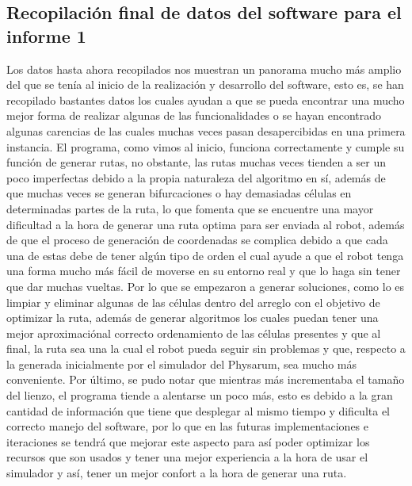 \subsection{Recopilaci\'on final de datos del software para el informe 1}
    Los datos hasta ahora recopilados nos muestran un panorama
        mucho m\'as amplio del que se ten\'ia al inicio de la realizaci\'on
        y desarrollo del software, esto es, se han recopilado
        bastantes datos los cuales ayudan a que se pueda encontrar
        una mucho mejor forma de realizar algunas de las
        funcionalidades o se hayan encontrado algunas carencias de
        las cuales muchas veces pasan desapercibidas en una
        primera instancia.
        \vskip 0.5cm
    El programa, como vimos al inicio, funciona correctamente
        y cumple su funci\'on de generar rutas, no obstante, las rutas
        muchas veces tienden a ser un poco imperfectas debido a la
        propia naturaleza del algoritmo en s\'i, adem\'as de que muchas
        veces se generan bifurcaciones o hay demasiadas c\'elulas en
        determinadas partes de la ruta, lo que fomenta que se
        encuentre una mayor dificultad a la hora de generar una ruta
        optima para ser enviada al robot, adem\'as de que el proceso
        de generaci\'on de coordenadas se complica debido a que cada
        una de estas debe de tener alg\'un tipo de orden el cual ayude
        a que el robot tenga una forma mucho m\'as f\'acil de moverse
        en su entorno real y que lo haga sin tener que dar muchas
        vueltas.
        \vskip 0.5cm
    Por lo que se empezaron a generar soluciones, como lo es
        limpiar y eliminar algunas de las c\'elulas dentro del arreglo
        con el objetivo de optimizar la ruta, adem\'as de generar
        algoritmos los cuales puedan tener una mejor aproximaci\'onal correcto ordenamiento de las c\'elulas presentes y que al
        final, la ruta sea una la cual el robot pueda seguir sin
        problemas y que, respecto a la generada inicialmente por el
        simulador del Physarum, sea mucho m\'as conveniente.
        Por \'ultimo, se pudo notar que mientras m\'as incrementaba el
        tama\~no del lienzo, el programa tiende a alentarse un poco
        m\'as, esto es debido a la gran cantidad de informaci\'on que
        tiene que desplegar al mismo tiempo y dificulta el correcto
        manejo del software, por lo que en las futuras
        implementaciones e iteraciones se tendr\'a que mejorar este
        aspecto para as\'i poder optimizar los recursos que son usados
        y tener una mejor experiencia a la hora de usar el simulador
        y as\'i, tener un mejor confort a la hora de generar una ruta.
        \vskip 0.5cm